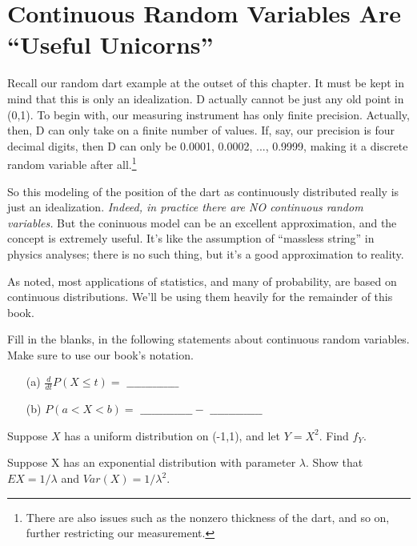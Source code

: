 \section{Continuous Random Variables Are ``Useful Unicorns''}
\label{unicorns}

Recall our random dart example at the outset of this chapter.  It must
be kept in mind that this is only an idealization.  D actually cannot be
just any old point in (0,1).  To begin with, our measuring instrument
has only finite precision.  Actually, then, D can only take on a finite
number of values.  If, say, our precision is four decimal digits, then D
can only be 0.0001, 0.0002, ...,  0.9999, making it a discrete random
variable after all.\footnote{There are also issues such as the nonzero
thickness of the dart, and so on, further restricting our measurement.}

So this modeling of the position of the dart as continuously distributed
really is just an idealization.  {\it Indeed, in practice there are NO
continuous random variables.}  But the coninuous model can be an
excellent approximation, and the concept is extremely useful.  It's like
the assumption of ``massless string'' in physics analyses; there is no
such thing, but it's a good approximation to reality.

As noted, most applications of statistics, and many of probability, are
based on continuous distributions.  We'll be using them heavily for the
remainder of this book.

\startproblemset

\oneproblem
Fill in the blanks, in the following statements about
continuous random variables.  Make sure to use our book's notation.

\begin{itemize}

\item [(a)] $\frac{d}{dt} P(X \leq t) = 
\textrm{ \_\_\_\_\_\_\_\_\_\_\_\_\_\_}$

\item [(b)] $P(a < X < b) =  
\textrm{ \_\_\_\_\_\_\_\_\_\_\_\_\_\_} -
\textrm{ \_\_\_\_\_\_\_\_\_\_\_\_\_\_}$

\end{itemize}

\oneproblem
Suppose $X$ has a uniform distribution on (-1,1), and let $Y = X^2$.
Find $f_Y$.

\oneproblem
Suppose X has an exponential distribution with parameter
$\lambda$.  Show that $EX = 1/\lambda$ and $Var(X) = 1/\lambda^2$.

